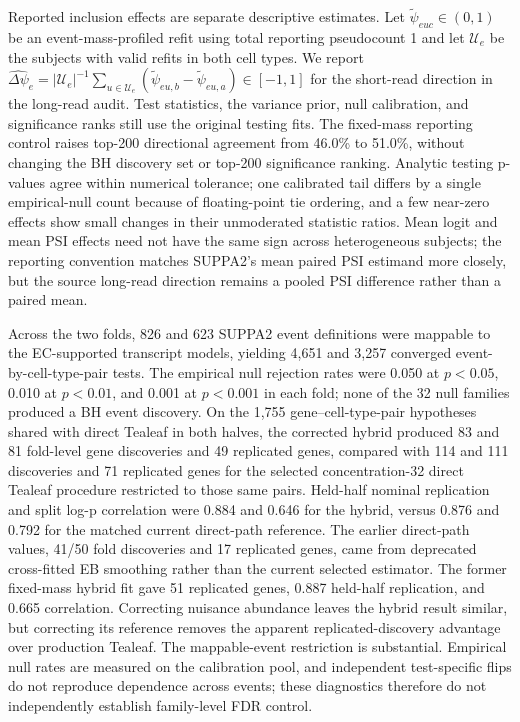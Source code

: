 \documentclass[11pt]{article}
\begin{document}
Reported inclusion effects are separate descriptive estimates. Let \(\widetilde\psi_{euc}\in(0,1)\) be an event-mass-profiled refit using total reporting pseudocount 1 and let \(\mathcal U_e\) be the subjects with valid refits in both cell types. We report \(\widehat{\Delta\psi}_e=|\mathcal U_e|^{-1}\sum_{u\in\mathcal U_e}(\widetilde\psi_{eu,b}-\widetilde\psi_{eu,a})\in[-1,1]\) for the short-read direction in the long-read audit. Test statistics, the variance prior, null calibration, and significance ranks still use the original testing fits. The fixed-mass reporting control raises top-200 directional agreement from 46.0\% to 51.0\%, without changing the BH discovery set or top-200 significance ranking. Analytic testing p-values agree within numerical tolerance; one calibrated tail differs by a single empirical-null count because of floating-point tie ordering, and a few near-zero effects show small changes in their unmoderated statistic ratios. Mean logit and mean PSI effects need not have the same sign across heterogeneous subjects; the reporting convention matches SUPPA2's mean paired PSI estimand more closely, but the source long-read direction remains a pooled PSI difference rather than a paired mean.

Across the two folds, 826 and 623 SUPPA2 event definitions were mappable to the EC-supported transcript models, yielding 4,651 and 3,257 converged event-by-cell-type-pair tests. The empirical null rejection rates were 0.050 at \(p<0.05\), 0.010 at \(p<0.01\), and 0.001 at \(p<0.001\) in each fold; none of the 32 null families produced a BH event discovery. On the 1,755 gene--cell-type-pair hypotheses shared with direct Tealeaf in both halves, the corrected hybrid produced 83 and 81 fold-level gene discoveries and 49 replicated genes, compared with 114 and 111 discoveries and 71 replicated genes for the selected concentration-32 direct Tealeaf procedure restricted to those same pairs. Held-half nominal replication and split log-p correlation were 0.884 and 0.646 for the hybrid, versus 0.876 and 0.792 for the matched current direct-path reference. The earlier direct-path values, 41/50 fold discoveries and 17 replicated genes, came from deprecated cross-fitted EB smoothing rather than the current selected estimator. The former fixed-mass hybrid fit gave 51 replicated genes, 0.887 held-half replication, and 0.665 correlation. Correcting nuisance abundance leaves the hybrid result similar, but correcting its reference removes the apparent replicated-discovery advantage over production Tealeaf. The mappable-event restriction is substantial. Empirical null rates are measured on the calibration pool, and independent test-specific flips do not reproduce dependence across events; these diagnostics therefore do not independently establish family-level FDR control.
\end{document}
